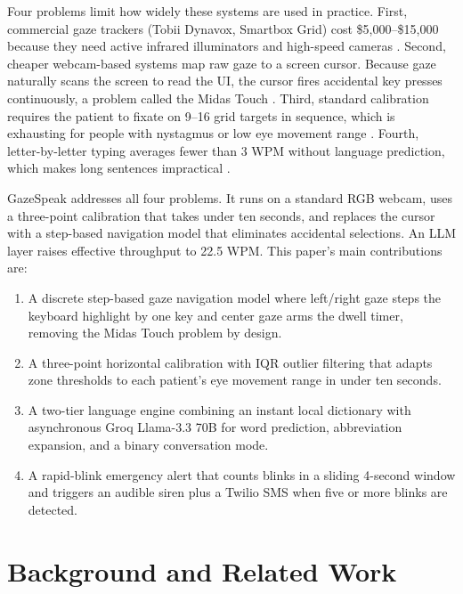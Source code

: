 \documentclass[conference]{IEEEtran}
\begin{document}
Four problems limit how widely these systems are used in practice.
First, commercial gaze trackers (Tobii Dynavox, Smartbox Grid) cost \$5,000--\$15,000 because
they need active infrared illuminators and high-speed cameras \cite{abilkaiyrkyzy2024dialogue}.
Second, cheaper webcam-based systems map raw gaze to a screen cursor. Because gaze naturally
scans the screen to read the UI, the cursor fires accidental key presses continuously, a problem
called the Midas Touch \cite{soukupova2016real}.
Third, standard calibration requires the patient to fixate on 9--16 grid targets in sequence,
which is exhausting for people with nystagmus or low eye movement range \cite{trnka2009user}.
Fourth, letter-by-letter typing averages fewer than 3 WPM without language prediction, which
makes long sentences impractical \cite{singh2025innovative}.

GazeSpeak addresses all four problems. It runs on a standard RGB webcam, uses a three-point
calibration that takes under ten seconds, and replaces the cursor with a step-based navigation
model that eliminates accidental selections. An LLM layer raises effective throughput to
22.5 WPM. This paper's main contributions are:

\begin{enumerate}
    \item A discrete step-based gaze navigation model where left/right gaze steps the keyboard
          highlight by one key and center gaze arms the dwell timer, removing the Midas Touch
          problem by design.
    \item A three-point horizontal calibration with IQR outlier filtering that adapts zone
          thresholds to each patient's eye movement range in under ten seconds.
    \item A two-tier language engine combining an instant local dictionary with asynchronous
          Groq Llama-3.3 70B for word prediction, abbreviation expansion, and a binary
          conversation mode.
    \item A rapid-blink emergency alert that counts blinks in a sliding 4-second window and
          triggers an audible siren plus a Twilio SMS when five or more blinks are detected.
\end{enumerate}

\section{Background and Related Work}
\end{document}
